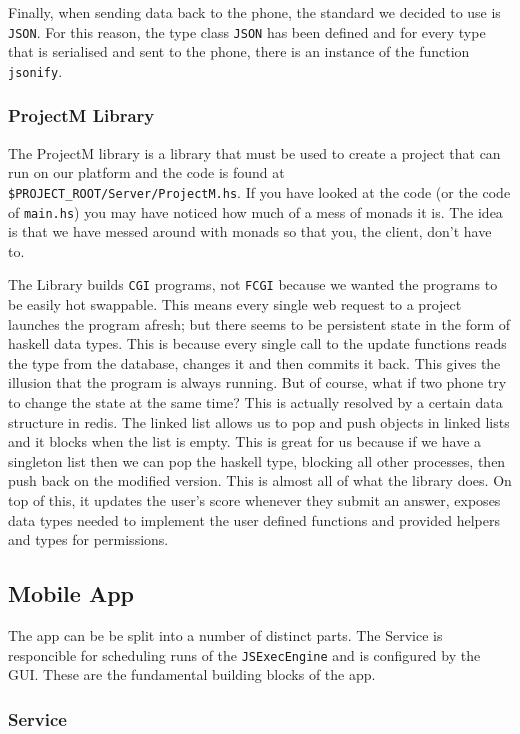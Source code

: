 \documentclass{article}
\begin{document}
Finally, when sending data back to the phone, the standard we decided to use is \texttt{JSON}. For this reason, the type class \texttt{JSON}
has been defined and for every type that is serialised and sent to the phone, there is an instance of the function \texttt{jsonify}.

\subsubsection{ProjectM Library}
The ProjectM library is a library that must be used to create a project that can run on our platform and the code is found at
\texttt{\$PROJECT\_ROOT/Server/ProjectM.hs}. If you have looked at the code (or the code of \texttt{main.hs}) you may have noticed
how much of a mess of monads it is. The idea is that we have messed around with monads so that you, the client, don't have to.

The Library builds \texttt{CGI} programs, not \texttt{FCGI} because we wanted the programs to be easily hot swappable. This means
every single web request to a project launches the program afresh; but there seems to be persistent state in the form of haskell
data types. This is because every single call to the update functions reads the type from the database, changes it and then commits it
back. This gives the illusion that the program is always running. But of course, what if two phone try to change the state at the same time?
This is actually resolved by a certain data structure in redis. The linked list allows us to pop and push objects in linked lists and it blocks
when the list is empty. This is great for us because if we have a singleton list then we can pop the haskell type, blocking all other
processes, then push back on the modified version. This is almost all of what the library does. On top of this, it updates the user's
score whenever they submit an answer, exposes data types needed to implement the user defined functions and provided helpers
and types for permissions.

\subsection{Mobile App}
The app can be be split into a number of distinct parts. The Service is responcible for scheduling runs of the \texttt{JSExecEngine} and is
configured by the GUI. These are the fundamental building blocks of the app.

\subsubsection{Service}
\end{document}
